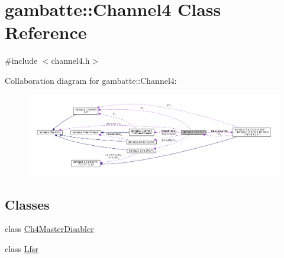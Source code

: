 \hypertarget{classgambatte_1_1Channel4}{}\section{gambatte\+:\+:Channel4 Class Reference}
\label{classgambatte_1_1Channel4}


{\ttfamily \#include $<$channel4.\+h$>$}



Collaboration diagram for gambatte\+:\+:Channel4\+:
\nopagebreak
\begin{figure}[H]
\begin{center}
\leavevmode
\includegraphics[width=350pt]{classgambatte_1_1Channel4__coll__graph}
\end{center}
\end{figure}
\subsection*{Classes}
\begin{DoxyCompactItemize}
\item 
class \hyperlink{classgambatte_1_1Channel4_1_1Ch4MasterDisabler}{Ch4\+Master\+Disabler}
\item 
class \hyperlink{classgambatte_1_1Channel4_1_1Lfsr}{Lfsr}
\end{DoxyCompactItemize}
